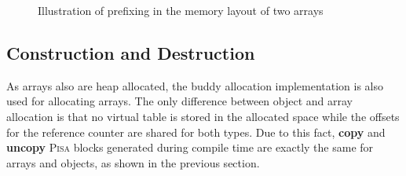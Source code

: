 \begin{figure}[ht]
\begin{subfigure}[ht]{.32\textwidth}
    \end{subfigure}
    \caption{Illustration of prefixing in the memory layout of two \rooplpp arrays}
    \label{fig:array-layout}
\end{figure}
\newpage
\subsection{Construction and Destruction}
\label{subsec:construction-destruction}
As \rooplpp arrays also are heap allocated, the buddy allocation implementation is also used for allocating arrays. The only difference between object and array allocation is that no virtual table is stored in the allocated space while the offsets for the reference counter are shared for both types. Due to this fact, \textbf{copy} and \textbf{uncopy} \textsc{Pisa} blocks generated during compile time are exactly the same for arrays and objects, as shown in the previous section.


